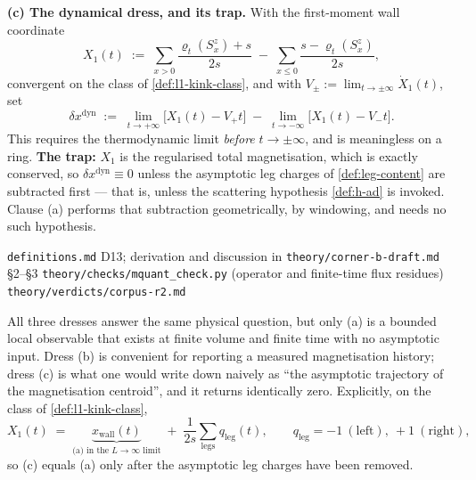 \begin{definition}
\smallskip
\noindent\textbf{(c) The dynamical dress, and its trap.} With the first-moment
wall coordinate
\begin{equation}
  X_1(t)\;:=\;\sum_{x>0}\frac{\varrho_t(S^z_x)+s}{2s}
  \;-\;\sum_{x\le0}\frac{s-\varrho_t(S^z_x)}{2s},
  \label{eq:X1}
\end{equation}
convergent on the class of \cref{def:l1-kink-class}, and with
$V_\pm:=\lim_{t\to\pm\infty}\dot X_1(t)$, set
\begin{equation}
  \delta x^{\mathrm{dyn}}\;:=\;\lim_{t\to+\infty}\bigl[X_1(t)-V_+t\bigr]
  \;-\;\lim_{t\to-\infty}\bigl[X_1(t)-V_-t\bigr].
\end{equation}
This requires the thermodynamic limit \emph{before} $t\to\pm\infty$, and is
meaningless on a ring. \textbf{The trap:} $X_1$ is the regularised total
magnetisation, which is exactly conserved, so $\delta x^{\mathrm{dyn}}\equiv0$
unless the asymptotic leg charges of \cref{def:leg-content} are subtracted
first --- that is, unless the scattering hypothesis \cref{def:h-ad} is invoked.
Clause (a) performs that subtraction geometrically, by windowing, and needs no
such hypothesis.
\end{definition}

%
{\texttt{definitions.md} D13; derivation and discussion in
 \texttt{theory/corner-b-draft.md} \S2--\S3}%
{\texttt{theory/checks/mquant\_check.py} (operator and finite-time flux
 residues)}%
{\texttt{theory/verdicts/corpus-r2.md}}

\begin{remark}
\label{rem:why-a}
All three dresses answer the same physical question, but only (a) is a bounded
local observable that exists at finite volume and finite time with no
asymptotic input. Dress (b) is convenient for reporting a measured
magnetisation history; dress (c) is what one would write down naively as ``the
asymptotic trajectory of the magnetisation centroid'', and it returns
identically zero. Explicitly, on the class of \cref{def:l1-kink-class},
\begin{equation}
  X_1(t)\;=\;\underbrace{x_{\mathrm{wall}}(t)}_{\text{(a) in the }L\to\infty
  \text{ limit}}\;+\;\frac{1}{2s}\sum_{\mathrm{legs}}q_{\mathrm{leg}}(t),
  \qquad q_{\mathrm{leg}}=-1\ (\text{left}),\ +1\ (\text{right}),
\end{equation}
so (c) equals (a) only after the asymptotic leg charges have been removed.
\end{remark}

